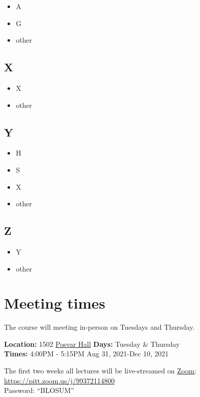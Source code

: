 \documentclass[
]{book}
\providecommand{\tightlist}{%
  \setlength{\itemsep}{0pt}\setlength{\parskip}{0pt}}
\begin{document}
\begin{itemize}
\tightlist
\item
  A
\item
  G
\item
  other
\end{itemize}

\hypertarget{x}{%
\section{X}\label{x}}

\begin{itemize}
\tightlist
\item
  X
\item
  other
\end{itemize}

\hypertarget{y}{%
\section{Y}\label{y}}

\begin{itemize}
\tightlist
\item
  H
\item
  S
\item
  X
\item
  other
\end{itemize}

\hypertarget{z}{%
\section{Z}\label{z}}

\begin{itemize}
\tightlist
\item
  Y
\item
  other
\end{itemize}

\hypertarget{meeting-times}{%
\chapter{Meeting times}\label{meeting-times}}

The course will meeting in-person on Tuesdays and Thursday.

\textbf{Location:} 1502 \href{https://www.tour.pitt.edu/tour/wesley-w-posvar-hall}{Posvar Hall}
\textbf{Days:} Tuesday \& Thursday\\
\textbf{Times:} 4:00PM - 5:15PM
Aug 31, 2021-Dec 10, 2021

The first two weeks all lectures will be live-streamed on \href{https://pitt.zoom.us/j/99372114800}{Zoom}: \url{https://pitt.zoom.us/j/99372114800}\\
Password: ``BLOSUM''
\end{document}
